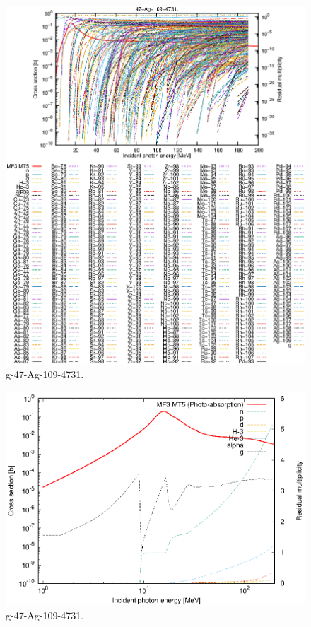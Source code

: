 \begin{figure}
 \includegraphics[width=\linewidth]{eps/g_47-Ag-109_4731.eps}
  \caption{g-47-Ag-109-4731.}
\end{figure}
\newpage \clearpage

\begin{figure}
 \includegraphics[width=\linewidth]{eps-log/g_47-Ag-109_4731.eps}
 \caption{g-47-Ag-109-4731.}
\end{figure}
\newpage \clearpage

